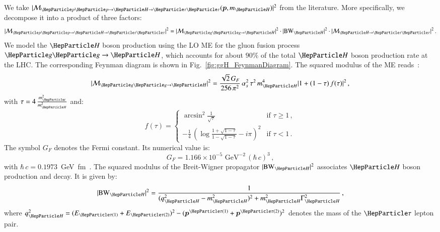 We take $\vert \mathcal{M}_{\Pp\Pp \to \PHiggs \to
  \Pgt\Pgt}(\bm{p},m_{\PHiggs}) \vert^{2}$ from the literature.
More specifically, we decompose it into a product of three factors:
\begin{equation}
\vert \mathcal{M}_{\Pp\Pp \to \PHiggs \to \Pgt\Pgt} \vert^{2} =
 \vert \mathcal{M}_{\Pg\Pg \to \PHiggs} \vert^{2} 
\cdot \vert \BW_{\PHiggs} \vert^{2} 
\cdot \vert \mathcal{M}_{\PHiggs \to \Pgt\Pgt} \vert^{2} \, .
\label{eq:meHiggsProduction_and_Decay}
\end{equation}
We model the $\PHiggs$ boson production using the LO ME for the gluon fusion process $\Pg\Pg \to \PHiggs$,
which accounts for about $90\%$ of the total $\PHiggs$ boson production rate at the LHC.
The corresponding Feynman diagram is shown in Fig.~\ref{fig:ggH_FeynmanDiagram}.
The squared modulus of the ME reads~\cite{me_ggHprod}:
\begin{equation}
\vert \mathcal{M}_{\Pg\Pg \to \PHiggs} \vert^{2} = 
 \frac{\sqrt{2} \, G_{F}}{256 \, \pi^{2}} \, \alpha_{s}^{2} \, \tau^{2} \, m_{\PHiggs}^{4} \vert 1 + (1 - \tau) \, f(\tau) \vert^{2} \, ,
\label{eq:meHiggsProduction}
\end{equation}
with $\tau = 4\, \frac{m_{\Pqt}^{2}}{m_{\PHiggs}^{2}}$ and:
\begin{equation}
f(\tau) = 
\begin{cases} 
\arcsin^{2} \frac{1}{\sqrt{\tau}}  & \mbox{if } \tau \geq 1 \, , \\
-\frac{1}{4} \, \left( \log\frac{1 + \sqrt{1 - \tau}}{1 - \sqrt{1 - \tau}} - i\pi \right)^{2} & \mbox{if } \tau < 1 \, .
\end{cases}
\label{eq:meHiggsProduction_ftau}
\end{equation}
The symbol $G_{F}$ denotes the Fermi constant. Its numerical value is:
\begin{equation} 
G_{F} = 1.166 \times 10^{-5}\mbox{~GeV}^{-2} \, (\hbar \, c)^3 \, ,
\label{eq:def_G_F} 
\end{equation}
with $\hbar \, c = 0.1973$~GeV~fm~\cite{PDG}.
The squared modulus of the Breit-Wigner propagator $\vert \BW_{\PHiggs} \vert^{2}$ associates $\PHiggs$ boson production and decay.
It is given by:
\begin{equation}
\vert \BW_{\PHiggs} \vert^{2} = \frac{1}{(q_{\PHiggs}^{2} -
  m_{\PHiggs}^{2})^{2} + m_{\PHiggs}^{2}\Gamma_{\PHiggs}^{2}} \, ,
\label{eq:meHiggsBreitWigner}
\end{equation}
where $q_{\PHiggs}^{2} = (E_{\Pgt(1)} + E_{\Pgt(2)})^{2} - (\bm{p}^{\Pgt(1)} + \bm{p}^{\Pgt(2)})^{2}$ denotes the mass of the $\Pgt$ lepton pair.
